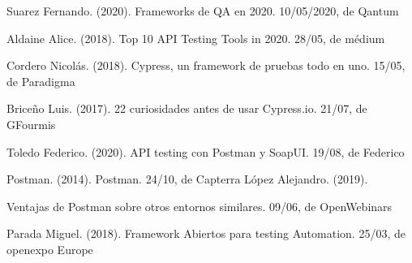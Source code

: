 \documentclass[letterpaper, 12pt, spanish]{article}
\begin{document}

\setlength{\parindent}{-0.2in}
\setlength{\leftskip}{0.2in}
\setlength{\parskip}{8pt}
\vspace*{-0.2in}
\noindent

Suarez Fernando. (2020). Frameworks de QA en 2020. 10/05/2020, de Qantum 

Aldaine Alice. (2018). Top 10 API Testing Tools in 2020. 28/05, de médium

Cordero Nicolás. (2018). Cypress, un framework de pruebas todo en uno. 15/05, de Paradigma 

Briceño Luis. (2017). 22 curiosidades antes de usar Cypress.io. 21/07, de GFourmis 

Toledo Federico. (2020). API testing con Postman y SoapUI. 19/08, de Federico 

Postman. (2014). Postman. 24/10, de Capterra 
López Alejandro. (2019). 

Ventajas de Postman sobre otros entornos similares. 09/06, de OpenWebinars

Parada Miguel. (2018). Framework Abiertos para testing Automation. 25/03, de openexpo Europe 
\end{document}
